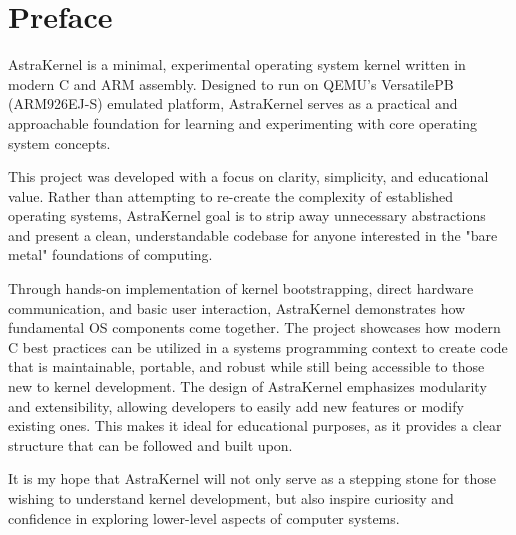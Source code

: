 \doublespacing
\newpage
{}
\section*{Preface}

AstraKernel is a minimal, experimental operating system kernel written in modern 
C and ARM assembly. Designed to run on QEMU’s VersatilePB (ARM926EJ-S) emulated 
platform, AstraKernel serves as a practical and approachable foundation for 
learning and experimenting with core operating system concepts.

This project was developed with a focus on clarity, simplicity, and educational 
value. Rather than attempting to re-create the complexity of established operating 
systems, AstraKernel goal is to strip away unnecessary abstractions and present a 
clean, understandable codebase for anyone interested in the "bare metal" 
foundations of computing.

Through hands-on implementation of kernel bootstrapping, direct hardware 
communication, and basic user interaction, AstraKernel demonstrates how 
fundamental OS components come together. The project showcases how modern C 
best practices can be utilized in a systems programming context to create 
code that is maintainable, portable, and robust while still being
accessible to those new to kernel development. The design of AstraKernel 
emphasizes modularity and extensibility, allowing developers to easily add new 
features or modify existing ones. This makes it ideal for educational purposes, 
as it provides a clear structure that can be followed and built upon.

It is my hope that AstraKernel will not only serve as a stepping stone 
for those wishing to understand kernel development, but also inspire curiosity 
and confidence in exploring lower-level aspects of computer systems.

